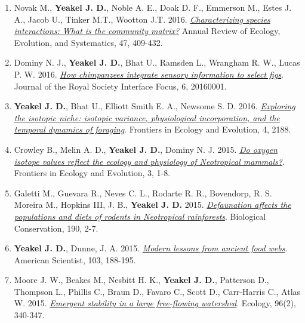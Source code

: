 \documentclass[margin,line,12pt]{res}
\begin{document}
\begin{resume}
\begin{enumerate}
\item Novak M., \textbf{Yeakel J. D.}, Noble A. E., Doak D. F., Emmerson M., Estes J. A., Jacob U., Tinker M.T., Wootton J.T. 2016. \href{https://pubs.er.usgs.gov/publication/70173930}{\emph{Characterizing species interactions: What is the community matrix?}} Annual Review of Ecology, Evolution, and Systematics, 47, 409-432.

\item Dominy N. J., \textbf{Yeakel J. D.}, Bhat U., Ramsden L., Wrangham R. W., Lucas P. W. 2016. \href{https://royalsocietypublishing.org/doi/full/10.1098/rsfs.2016.0001}{\emph{How chimpanzees integrate sensory information to select figs}}. Journal of the Royal Society Interface Focus, 6, 20160001.

\item \textbf{Yeakel J. D.}, Bhat U., Elliott Smith E. A., Newsome S. D. 2016. \href{https://www.frontiersin.org/articles/10.3389/fevo.2016.00001/full}{\emph{Exploring the isotopic niche: isotopic variance, physiological incorporation, and the temporal dynamics of foraging}}. Frontiers in Ecology and Evolution, 4, 2188.

\item Crowley B., Melin A. D., \textbf{Yeakel J. D.}, Dominy N. J. 2015. \href{https://www.frontiersin.org/articles/10.3389/fevo.2015.00127/full}{\emph{Do oxygen isotope values reflect the ecology and physiology of Neotropical mammals?}}. Frontiers in Ecology and Evolution, 3, 1-8.

\item Galetti M., Guevara R., Neves C. L., Rodarte R. R., Bovendorp, R. S. Moreira M., Hopkins III, J. B., \textbf{Yeakel J. D.} 2015. \href{https://www.sciencedirect.com/science/article/abs/pii/S000632071500186X}{\emph{Defaunation affects the populations and diets of rodents in Neotropical rainforests}}. Biological Conservation, 190, 2-7.

\item \textbf{Yeakel J. D.}, Dunne, J. A. 2015. \href{https://www.americanscientist.org/article/modern-lessons-from-ancient-food-webs}{\emph{Modern lessons from ancient food webs}}. American Scientist, 103, 188-195.

\item Moore J. W., Beakes M., Nesbitt H. K., \textbf{Yeakel J. D.}, Patterson D., Thompson L., Phillis C., Braun D., Favaro C., Scott D., Carr-Harris C., Atlas W. 2015. \href{https://esajournals.onlinelibrary.wiley.com/doi/full/10.1890/14-0326.1}{\emph{Emergent stability in a large free-flowing watershed}}. Ecology, 96(2), 340-347.


\end{enumerate}
\end{resume}
\end{document}
